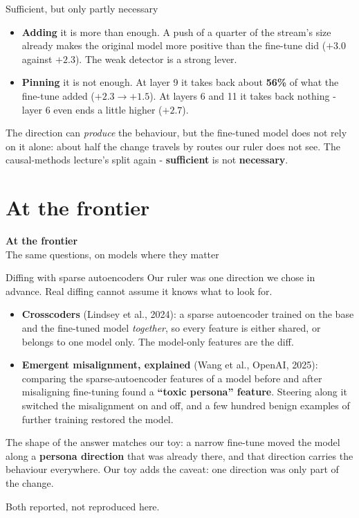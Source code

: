 \documentclass[aspectratio=169]{beamer}
\newcommand{\keybox}[1]{%
  \begin{tcolorbox}[colback=armblue!8, colframe=armblue, boxrule=0.6pt, arc=2pt]
  #1
  \end{tcolorbox}}
\newcommand{\sectiontransition}[2]{%
  \begin{frame}[plain]
    \vfill
    \begin{center}
      {\Huge\bfseries\color{popblue} #1}\\[1.1em]
      {\large #2}
    \end{center}
    \vfill
  \end{frame}}
\begin{document}
\begin{frame}{Sufficient, but only partly necessary}
  \vspace{0.3em}
  \begin{itemize}
    \item \textbf{Adding} it is more than enough. A push of a quarter of the stream's size already
      makes the original model more positive than the fine-tune did ($+3.0$ against $+2.3$). The
      weak detector is a strong lever.
    \item \textbf{Pinning} it is not enough. At layer 9 it takes back about \textbf{56\%} of what
      the fine-tune added ($+2.3 \rightarrow +1.5$). At layers 6 and 11 it takes back nothing -
      layer 6 even ends a little higher ($+2.7$).
  \end{itemize}

  \vspace{0.4em}
  \keybox{\small The direction can \emph{produce} the behaviour, but the fine-tuned model does not
  rely on it alone: about half the change travels by routes our ruler does not see. The
  causal-methods lecture's split again - \textbf{sufficient} is not \textbf{necessary}.}
\end{frame}

\section{At the frontier}
\sectiontransition{At the frontier}{The same questions, on models where they matter}

\begin{frame}{Diffing with sparse autoencoders}
  \vspace{0.1em}
  Our ruler was one direction we chose in advance. Real diffing cannot assume it knows what to
  look for.
  \begin{itemize}
    \item \textbf{Crosscoders} (Lindsey et al., 2024): a sparse autoencoder trained on the base and
      the fine-tuned model \emph{together}, so every feature is either shared, or belongs to one
      model only. The model-only features are the diff.
    \item \textbf{Emergent misalignment, explained} (Wang et al., OpenAI, 2025): comparing the
      sparse-autoencoder features of a model before and after misaligning fine-tuning found a
      \textbf{``toxic persona'' feature}. Steering along it switched the misalignment on and off,
      and a few hundred benign examples of further training restored the model.
  \end{itemize}

  \vspace{0.1em}
  \keybox{\small The shape of the answer matches our toy: a narrow fine-tune moved the model along
  a \textbf{persona direction} that was already there, and that direction carries the behaviour
  everywhere. Our toy adds the caveat: one direction was only part of the change.}
  \vspace{-0.4em}
  {\footnotesize Both reported, not reproduced here.}
\end{frame}
\end{document}
